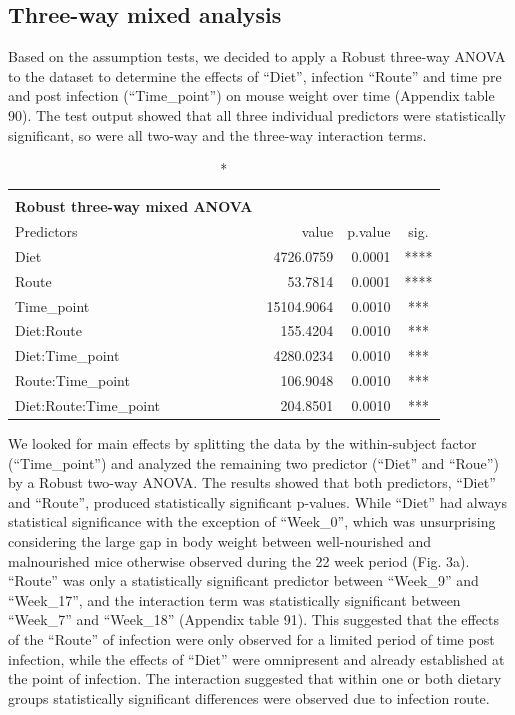 \documentclass[
  12pt,
  letterpaper,
]{article}
\begin{document}
\subsection{Three-way mixed analysis}\label{three-way-mixed-analysis}

Based on the assumption tests, we decided to apply a Robust three-way ANOVA to the dataset to determine the effects of ``Diet'', infection ``Route'' and time pre and post infection (``Time\_point'') on mouse weight over time (Appendix table 90). The test output showed that all three individual predictors were statistically significant, so were all two-way and the three-way interaction terms.

\begingroup
\fontsize{12.0pt}{14.4pt}\selectfont
\begin{longtable}{l|rrc}
\caption*{
{\large \textbf{Appendix Table 90}} \\ 
{\small \textbf{Robust three-way mixed ANOVA}}
} \\ 
\toprule
Predictors & {value} & {p.value} & {sig.} \\ 
\midrule\addlinespace[2.5pt]
Diet & 4726.0759 & 0.0001 & **** \\ 
Route & 53.7814 & 0.0001 & **** \\ 
Time\_point & 15104.9064 & 0.0010 & *** \\ 
Diet:Route & 155.4204 & 0.0010 & *** \\ 
Diet:Time\_point & 4280.0234 & 0.0010 & *** \\ 
Route:Time\_point & 106.9048 & 0.0010 & *** \\ 
Diet:Route:Time\_point & 204.8501 & 0.0010 & *** \\ 
\bottomrule
\end{longtable}
\endgroup

We looked for main effects by splitting the data by the within-subject factor (``Time\_point'') and analyzed the remaining two predictor (``Diet'' and ``Roue'') by a Robust two-way ANOVA. The results showed that both predictors, ``Diet'' and ``Route'', produced statistically significant p-values. While ``Diet'' had always statistical significance with the exception of ``Week\_0'', which was unsurprising considering the large gap in body weight between well-nourished and malnourished mice otherwise observed during the 22 week period (Fig. 3a). ``Route'' was only a statistically significant predictor between ``Week\_9'' and ``Week\_17'', and the interaction term was statistically significant between ``Week\_7'' and ``Week\_18'' (Appendix table 91). This suggested that the effects of the ``Route'' of infection were only observed for a limited period of time post infection, while the effects of ``Diet'' were omnipresent and already established at the point of infection. The interaction suggested that within one or both dietary groups statistically significant differences were observed due to infection route.
\end{document}
